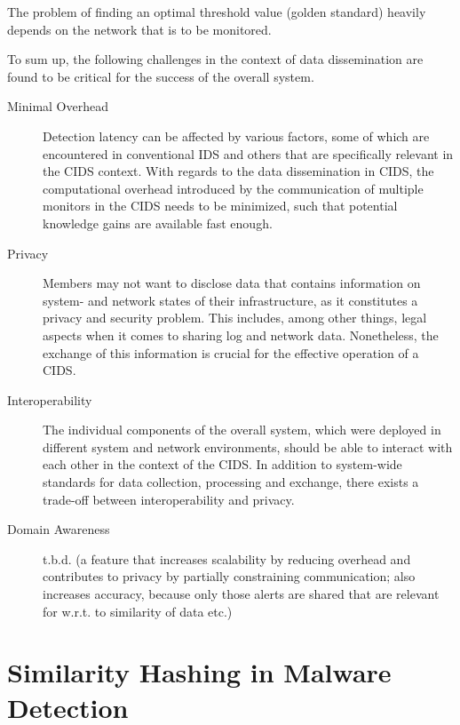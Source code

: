 The problem of finding an optimal threshold value (golden standard) heavily depends on the network that is to be monitored.


To sum up, the following challenges in the context of data dissemination are found to be critical for the success of the overall system. 
\begin{description}

    \item[Minimal Overhead] Detection latency can be affected by various factors, some of which are encountered in conventional IDS and others that are specifically relevant in the CIDS context. With regards to the data dissemination in CIDS, the computational overhead introduced by the communication of multiple monitors in the CIDS needs to be minimized, such that potential knowledge gains are available fast enough.

    \item[Privacy] Members may not want to disclose data that contains information on system- and network states of their infrastructure, as it constitutes a privacy and security problem. This includes, among other things, legal aspects when it comes to sharing log and network data. Nonetheless, the exchange of this information is crucial for the effective operation of a CIDS.
    
    \item[Interoperability] The individual components of the overall system, which were deployed in different system and network environments, should be able to interact with each other in the context of the CIDS. In addition to system-wide standards for data collection, processing and exchange, there exists a trade-off between interoperability and privacy.
    
    \item[Domain Awareness] t.b.d. (a feature that increases scalability by reducing overhead and contributes to privacy by partially constraining communication; also increases accuracy, because only those alerts are shared that are relevant for w.r.t. to similarity of data etc.)

\end{description}

\section{Similarity Hashing in Malware Detection}


